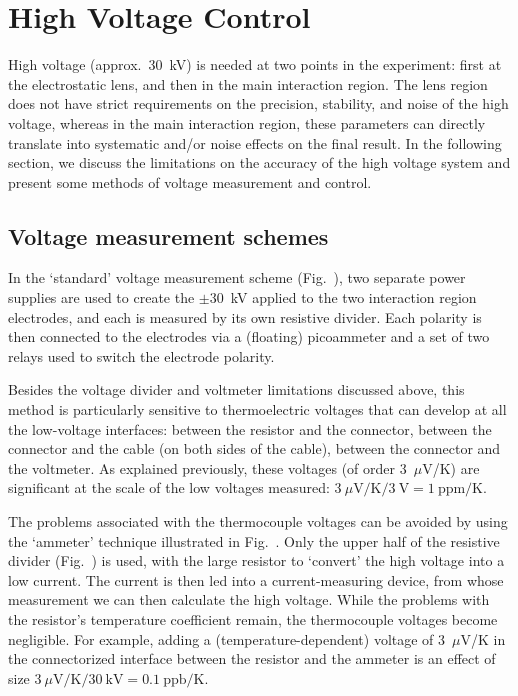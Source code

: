 \section{High Voltage Control}
\label{HV_chap}

High voltage (approx.\ 30~kV) is needed at two points in the experiment: first
at the electrostatic lens, and then in the main interaction region. The lens
region does not have strict requirements on the precision, stability, and noise
of the high voltage, whereas in the main interaction region, these parameters
can directly translate into systematic and/or noise effects on the final result.
In the following section, we discuss the limitations on the accuracy of the high
voltage system and present some methods of voltage measurement and control.

\subsection{Voltage measurement schemes}
\label{volt_meas_sect}

In the `standard' voltage measurement scheme (Fig.~), two separate
power supplies are used to create the $\pm30$~kV applied to the two interaction
region electrodes, and each is measured by its own resistive divider. Each
polarity is then connected to the electrodes via a (floating) picoammeter and a
set of two relays used to switch the electrode polarity.

Besides the voltage divider and voltmeter limitations discussed above, this
method is particularly sensitive to thermoelectric voltages that can develop at
all the low-voltage interfaces: between the resistor and the connector, between
the connector and the cable (on both sides of the cable), between the connector
and the voltmeter. As explained previously, these voltages (of order 3~$\mu$V/K)
are significant at the scale of the low voltages measured: $3~\mu\text{V/K}/3~\text{V}=1~\text{ppm/K}$.

The problems associated with the thermocouple voltages can be avoided by using
the `ammeter' technique illustrated in Fig.~. Only the upper half
of the resistive divider (Fig.~) is used, with the large
resistor to `convert' the high voltage into a low current. The current is then
led into a current-measuring device, from whose measurement we can then
calculate the high voltage. While the problems with the resistor's temperature
coefficient remain, the thermocouple voltages become negligible. For example,
adding a (temperature-dependent) voltage of 3~$\mu$V/K in the connectorized
interface between the resistor and the ammeter is an effect of size
$3~\mu\text{V/K}/30~\text{kV}=0.1~\text{ppb/K}$.

